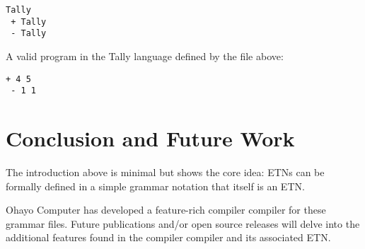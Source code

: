 \documentclass[journal]{IEEEtran}
\begin{document}
\begin{lstlisting}
Tally
 + Tally
 - Tally
\end{lstlisting}

A valid program in the Tally language defined by the file above:

\begin{lstlisting}
+ 4 5
 - 1 1
\end{lstlisting}

\section{Conclusion and Future Work}

The introduction above is minimal but shows the core idea: ETNs can be formally defined in a simple grammar notation that itself is an ETN.

Ohayo Computer has developed a feature-rich compiler compiler for these grammar files. Future publications and/or open source releases will delve into the additional features found in the compiler compiler and its associated ETN.
\end{document}
